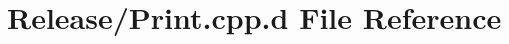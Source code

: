 \hypertarget{_release_2_print_8cpp_8d}{\section{\-Release/\-Print.cpp.\-d \-File \-Reference}
\label{_release_2_print_8cpp_8d}
}

